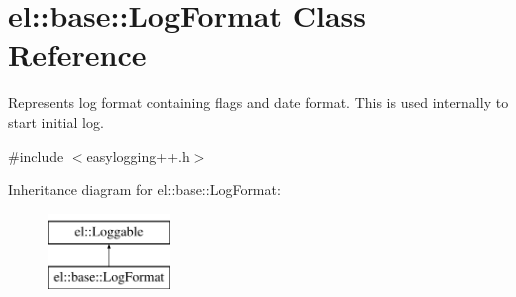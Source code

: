 \hypertarget{classel_1_1base_1_1LogFormat}{\section{el\-:\-:base\-:\-:Log\-Format Class Reference}
\label{classel_1_1base_1_1LogFormat}
}


Represents log format containing flags and date format. This is used internally to start initial log.  




{\ttfamily \#include $<$easylogging++.\-h$>$}

Inheritance diagram for el\-:\-:base\-:\-:Log\-Format\-:\begin{figure}[H]
\begin{center}
\leavevmode
\includegraphics[height=2.000000cm]{classel_1_1base_1_1LogFormat}
\end{center}
\end{figure}
